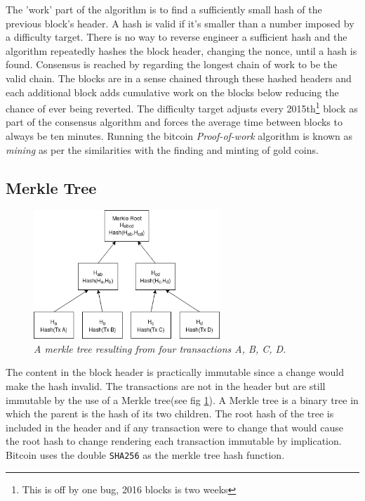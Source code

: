 The 'work' part of the algorithm is to find a sufficiently small hash of the previous block's header. A hash is valid if it's smaller than a number imposed by a difficulty target. There is no way to reverse engineer a sufficient hash and the algorithm repeatedly hashes the block header, changing the nonce, until a hash is found. Consensus is reached by regarding the longest chain of work to be the valid chain. The blocks are in a sense chained through these hashed headers and each additional block adds cumulative work on the blocks below reducing the chance of ever being reverted. The difficulty target adjusts every 2015th\footnote{This is off by one bug, 2016 blocks is two weeks} block\cite{repository:bitcoin} as part of the consensus algorithm and forces the average time between blocks to always be ten minutes. Running the bitcoin \textit{Proof-of-work} algorithm is known as \textit{mining} as per the similarities with the finding and minting of gold coins.

\subsection{Merkle Tree}

\begin{figure}[!htb]
	
	\centering
	\includegraphics[width=7cm]{merkle.png}
	\caption{\textit{A merkle tree resulting from four transactions A, B, C, D.
	}}
	\label{fig:merkle:tree}
	
\end{figure}

The content in the block header is practically immutable since a change would make the hash invalid. The transactions are not in the header but are still immutable by the use of a Merkle tree(see fig \ref{fig:merkle:tree}). A Merkle tree is a binary tree in which the parent is the hash of its two children. The root hash of the tree is included in the header and if any transaction were to change that would cause the root hash to change rendering each transaction immutable by implication. Bitcoin uses the double \texttt{SHA256} as the merkle tree hash function.

